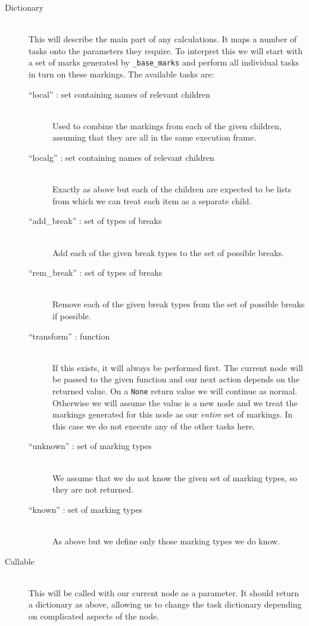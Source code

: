 \documentclass[twoside,a4paper]{report}
\begin{document}
\begin{description}
\item[Dictionary] \hfill \\
This will describe the main part of any calculations. It maps a number of tasks onto the parameters they require. To interpret this we will
start with a set of marks generated by \texttt{\_base\_marks} and perform all individual tasks in turn on these markings. The available tasks are:

\begin{description}
\item[``local'' : set containing names of relevant children] \hfill \\
Used to combine the markings from each of the given children, assuming that they are all in the same execution frame.
\item[``localg'' : set containing names of relevant children] \hfill \\
Exactly as above but each of the children are expected to be lists from which we can treat each item as a separate child.
\item[``add\_break'' : set of types of breaks] \hfill \\
Add each of the given break types to the set of possible breaks.
\item[``rem\_break'' : set of types of breaks] \hfill \\
Remove each of the given break types from the set of possible breaks if possible.
\item[``transform'' : function] \hfill \\
If this exists, it will always be performed first. The current node will be passed to the given function and our next action depends on the returned value. On a
\texttt{None} return value we will continue as normal. Otherwise we will assume the value is a new node and we treat the markings generated for this node as our
\textit{entire} set of markings. In this case we do not execute any of the other tasks here.
\item[``unknown'' : set of marking types] \hfill \\
We assume that we do not know the given set of marking types, so they are not returned.
\item[``known'' : set of marking types] \hfill \\
As above but we define only those marking types we do know.
\end{description}

\item[Callable] \hfill \\
This will be called with our current node as a parameter. It should return a dictionary as above, allowing us to change the task dictionary depending on
complicated aspects of the node.


\end{description}
\end{document}
